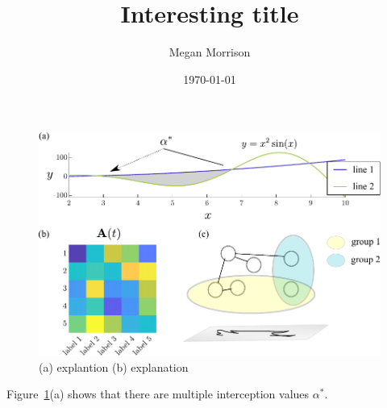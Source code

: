 \documentclass{article}
\title{Interesting title}
\author{Megan Morrison}
\date{\today}
\begin{document}
\maketitle


\begin{figure}[t]
    \centering
    \includegraphics[width=1.0\linewidth]{figures/demo_panel.pdf}
    \caption{(a) explantion (b) explanation}
    \label{fig:demo_panel}
\end{figure}

Figure~\ref{fig:demo_panel}(a) shows that there are multiple interception values $\alpha^*$. 

\lipsum
\end{document}
